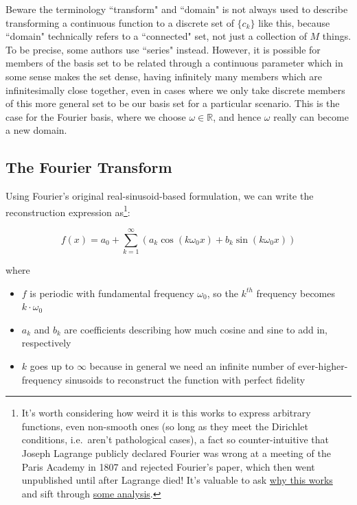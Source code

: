 \documentclass[10pt]{article}
\begin{document}
Beware the terminology ``transform" and ``domain" is not always used to describe transforming a continuous function to a discrete set of $\{c_k\}$ like this, because ``domain" technically refers to a ``connected" set, not just a collection of $M$ things. To be precise, some authors use ``series" instead. However, it is possible for members of the basis set to be related through a continuous parameter which in some sense makes the set dense, having infinitely many members which are infinitesimally close together, even in cases where we only take discrete members of this more general set to be our basis set for a particular scenario. This is the case for the Fourier basis, where we choose $\omega \in \mathbb{R}$, and hence $\omega$ really can become a new domain.

\subsection{The Fourier Transform}\label{fourierT}

Using Fourier's original real-sinusoid-based formulation, we can write the reconstruction expression as\footnote{It's worth considering how weird it is this works to express arbitrary functions, even non-smooth ones (so long as they meet the Dirichlet conditions\cite{oppenheim}, i.e.~aren't pathological cases), a fact so counter-intuitive that Joseph Lagrange publicly declared Fourier was wrong at a meeting of the Paris Academy in 1807\cite{michigan} and rejected Fourier's paper, which then went unpublished until after Lagrange died!\cite{oppenheim} It's valuable to ask \href{https://math.stackexchange.com/questions/1105265/why-do-fourier-series-work}{why this works}\cite{why} and sift through \href{https://math.uchicago.edu/~may/REU2017/REUPapers/Xue.pdf}{some analysis}.\cite{chicago}}:

$$ f(x) = a_0 + \sum_{k=1}^{\infty} (a_k \cos(k \omega_0 x) + b_k \sin(k \omega_0 x))$$

where
\begin{itemize}[noitemsep, topsep=0pt, after=\newline]
	\item $f$ is periodic with fundamental frequency $\omega_0$, so the $k^{th}$ frequency becomes $k \cdot \omega_0$
	\item $a_k$ and $b_k$ are coefficients describing how much cosine and sine to add in, respectively
	\item $k$ goes up to $\infty$ because in general we need an infinite number of ever-higher-frequency sinusoids to reconstruct the function with perfect fidelity
\end{itemize}
\end{document}
